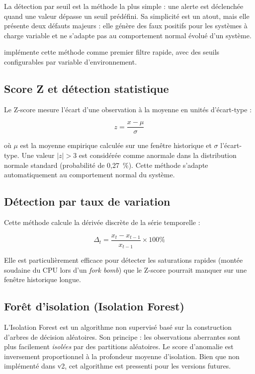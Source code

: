 La détection par seuil est la méthode la plus simple : une alerte est déclenchée
quand une valeur dépasse un seuil prédéfini. Sa simplicité est un atout, mais elle
présente deux défauts majeurs : elle génère des faux positifs pour les systèmes à
charge variable et ne s'adapte pas au comportement normal évolué d'un système.

\caimp{} implémente cette méthode comme premier filtre rapide, avec des seuils
configurables par variable d'environnement.

\subsection{Score Z et détection statistique}

Le Z-score mesure l'écart d'une observation à la moyenne en unités d'écart-type :

\begin{equation}
  z = \frac{x - \mu}{\sigma}
  \label{eq:zscore}
\end{equation}

où $\mu$ est la moyenne empirique calculée sur une fenêtre historique et $\sigma$
l'écart-type. Une valeur $|z| > 3$ est considérée comme anormale dans la
distribution normale standard (probabilité de 0,27~\%). Cette méthode s'adapte
automatiquement au comportement normal du système.

\subsection{Détection par taux de variation}

Cette méthode calcule la dérivée discrète de la série temporelle :

\begin{equation}
  \Delta_t = \frac{x_t - x_{t-1}}{x_{t-1}} \times 100\%
  \label{eq:rateofchange}
\end{equation}

Elle est particulièrement efficace pour détecter les saturations rapides (montée
soudaine du CPU lors d'un \textit{fork bomb}) que le Z-score pourrait manquer
sur une fenêtre historique longue.

\subsection{Forêt d'isolation (Isolation Forest)}

L'Isolation Forest \cite{liu2008isolation} est un algorithme non supervisé basé
sur la construction d'arbres de décision aléatoires. Son principe : les observations
aberrantes sont plus facilement \textit{isolées} par des partitions aléatoires.
Le score d'anomalie est inversement proportionnel à la profondeur moyenne
d'isolation. Bien que non implémenté dans \caimp{} v2, cet algorithme est
pressenti pour les versions futures.


